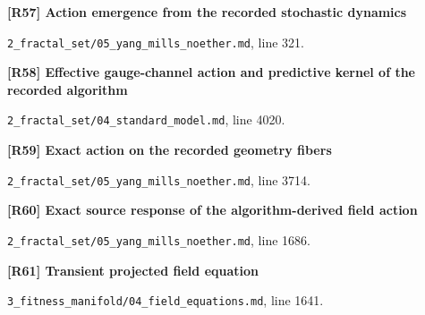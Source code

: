 \documentclass[11pt,a4paper]{article}
\begin{document}
\par\medskip\noindent\begin{minipage}{\linewidth}\textbf{[R57] Action emergence from the recorded stochastic dynamics}\label{src:thm-ym-recorded-action-emergence}\par
{\small\texttt{}\par
\nolinkurl{2_fractal_set/05_yang_mills_noether.md}, line 321.\par}
\end{minipage}\par

\par\medskip\noindent\begin{minipage}{\linewidth}\textbf{[R58] Effective gauge-channel action and predictive kernel of the recorded algorithm}\label{src:thm-sm-effective-recorded-gauge-dynamics}\par
{\small\texttt{}\par
\nolinkurl{2_fractal_set/04_standard_model.md}, line 4020.\par}
\end{minipage}\par

\par\medskip\noindent\begin{minipage}{\linewidth}\textbf{[R59] Exact action on the recorded geometry fibers}\label{src:thm-ym-native-geometry-fiber-action}\par
{\small\texttt{}\par
\nolinkurl{2_fractal_set/05_yang_mills_noether.md}, line 3714.\par}
\end{minipage}\par

\par\medskip\noindent\begin{minipage}{\linewidth}\textbf{[R60] Exact source response of the algorithm-derived field action}\label{src:thm-ym-native-source-response}\par
{\small\texttt{}\par
\nolinkurl{2_fractal_set/05_yang_mills_noether.md}, line 1686.\par}
\end{minipage}\par

\par\medskip\noindent\begin{minipage}{\linewidth}\textbf{[R61] Transient projected field equation}\label{src:thm-algorithmic-transient-field-memory}\par
{\small\texttt{}\par
\nolinkurl{3_fitness_manifold/04_field_equations.md}, line 1641.\par}
\end{minipage}\par
\end{document}
